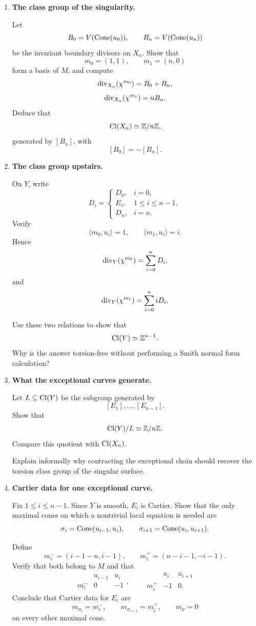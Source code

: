 \begin{enumerate}[label=\textbf{Hint \arabic*.},wide=0pt]

\item \textbf{The class group of the singularity.}

Let
\[
B_0=V(\operatorname{Cone}(u_0)),
\qquad
B_n=V(\operatorname{Cone}(u_n))
\]
be the invariant boundary divisors on \(X_n\). Show that
\[
m_0=(1,1),
\qquad
m_1=(n,0)
\]
form a basis of \(M\), and compute
\[
\operatorname{div}_{X_n}(\chi^{m_0})
=
B_0+B_n,
\]
\[
\operatorname{div}_{X_n}(\chi^{m_1})
=
nB_n.
\]
Deduce that
\[
\operatorname{Cl}(X_n)
\simeq
\mathbb{Z}/n\mathbb{Z},
\]
generated by \([B_n]\), with
\[
[B_0]=-[B_n].
\]

\item \textbf{The class group upstairs.}

On \(Y\), write
\[
D_i=
\begin{cases}
D_0,&i=0,\\
E_i,&1\leq i\leq n-1,\\
D_n,&i=n.
\end{cases}
\]
Verify
\[
\langle m_0,u_i\rangle=1,
\qquad
\langle m_1,u_i\rangle=i.
\]
Hence
\[
\operatorname{div}_Y(\chi^{m_0})
=
\sum_{i=0}^{n}D_i,
\]
and
\[
\operatorname{div}_Y(\chi^{m_1})
=
\sum_{i=0}^{n}iD_i.
\]

Use these two relations to show that
\[
\operatorname{Cl}(Y)
\simeq
\mathbb{Z}^{n-1}.
\]
Why is the answer torsion-free without performing a Smith normal form
calculation?

\item \textbf{What the exceptional curves generate.}

Let \(L\subseteq\operatorname{Cl}(Y)\) be the subgroup generated by
\[
[E_1],\ldots,[E_{n-1}].
\]
Show that
\[
\operatorname{Cl}(Y)/L
\simeq
\mathbb{Z}/n\mathbb{Z}.
\]
Compare this quotient with \(\operatorname{Cl}(X_n)\).

Explain informally why contracting the exceptional chain should
recover the torsion class group of the singular surface.

\item \textbf{Cartier data for one exceptional curve.}

Fix \(1\leq i\leq n-1\). Since \(Y\) is smooth, \(E_i\) is Cartier.
Show that the only maximal cones on which a nontrivial local equation
is needed are
\[
\sigma_i=\operatorname{Cone}(u_{i-1},u_i),
\qquad
\sigma_{i+1}=\operatorname{Cone}(u_i,u_{i+1}).
\]

Define
\[
m_i^-=(i-1-n,i-1),
\qquad
m_i^+=(n-i-1,-i-1).
\]
Verify that both belong to \(M\) and that
\[
\begin{array}{c|cc}
&
u_{i-1}
&
u_i
\\
\hline
m_i^-
&
0
&
-1
\end{array},
\qquad
\begin{array}{c|cc}
&
u_i
&
u_{i+1}
\\
\hline
m_i^+
&
-1
&
0.
\end{array}
\]
Conclude that Cartier data for \(E_i\) are
\[
m_{\sigma_i}=m_i^-,
\qquad
m_{\sigma_{i+1}}=m_i^+,
\qquad
m_\sigma=0
\]
on every other maximal cone.


\end{enumerate}
